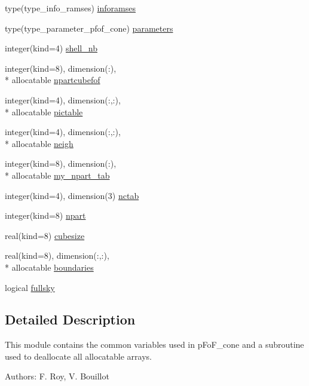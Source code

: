 \begin{DoxyCompactItemize}
\item 
type(type\-\_\-info\-\_\-ramses) \hyperlink{classmodvariables_ac5c429dcac062e12390685db02e3ae8a}{inforamses}
\item 
type(type\-\_\-parameter\-\_\-pfof\-\_\-cone) \hyperlink{classmodvariables_a3a05eb7a0d11075c67b3f7c927170b48}{parameters}
\item 
integer(kind=4) \hyperlink{classmodvariables_a8e749d6e70dade5cb6d75a09a99cefd7}{shell\-\_\-nb}
\item 
integer(kind=8), dimension(\-:), \\*
allocatable \hyperlink{classmodvariables_a5e0afff3c4cb1ac79dd8ec2f3a7752d9}{npartcubefof}
\item 
integer(kind=4), dimension(\-:,\-:), \\*
allocatable \hyperlink{classmodvariables_aa09a585a04de1f8fba311a2f440db992}{pictable}
\item 
integer(kind=4), dimension(\-:,\-:), \\*
allocatable \hyperlink{classmodvariables_a8602ecbf617fcd3d1c712a4ace68843c}{neigh}
\item 
integer(kind=8), dimension(\-:), \\*
allocatable \hyperlink{classmodvariables_a64ba80f97884e73fedc7341570a93bd9}{my\-\_\-npart\-\_\-tab}
\item 
integer(kind=4), dimension(3) \hyperlink{classmodvariables_a0a00ccc148897945f3defb5f775e4c18}{nctab}
\item 
integer(kind=8) \hyperlink{classmodvariables_a8c3df9e10fb71cff536986d2a33fa2c7}{npart}
\item 
real(kind=8) \hyperlink{classmodvariables_a12af092709e4d0b68394a217d16c4489}{cubesize}
\item 
real(kind=8), dimension(\-:,\-:), \\*
allocatable \hyperlink{classmodvariables_a0dd99db73cadd4dfd2c39cdc09b6da9b}{boundaries}
\item 
logical \hyperlink{classmodvariables_ace518a722b9c63f8c88c4915aa9a7549}{fullsky}
\end{DoxyCompactItemize}


\subsection{Detailed Description}
This module contains the common variables used in p\-Fo\-F\-\_\-cone and a subroutine used to deallocate all allocatable arrays. 

Authors\-: F. Roy, V. Bouillot 

